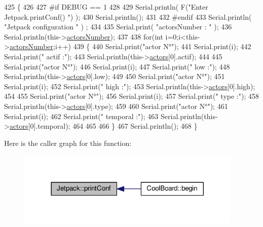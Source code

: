 \begin{DoxyCode}
425 \{
426 
427 \textcolor{preprocessor}{#if DEBUG == 1 }
428 
429     Serial.println( F(\textcolor{stringliteral}{"Enter Jetpack.printConf() "}) );
430     Serial.println();
431 
432 \textcolor{preprocessor}{#endif }
433     Serial.println( \textcolor{stringliteral}{"Jetpack configuration "} ) ;
434 
435     Serial.print( \textcolor{stringliteral}{"actorsNumber : "} );
436     Serial.println(this->\hyperlink{classJetpack_a52c86319cb3f7f1ab744a64db18a7ba5}{actorsNumber});
437  
438         \textcolor{keywordflow}{for}(\textcolor{keywordtype}{int} i=0;i<this->\hyperlink{classJetpack_a52c86319cb3f7f1ab744a64db18a7ba5}{actorsNumber};i++)
439     \{   
440         Serial.print(\textcolor{stringliteral}{"actor N°"});
441         Serial.print(i);
442         Serial.print(\textcolor{stringliteral}{" actif :"});
443         Serial.println(this->\hyperlink{classJetpack_a7e16d2f97837f9712a2e6de1c50d99db}{actors}[0].actif);
444 
445         Serial.print(\textcolor{stringliteral}{"actor N°"});
446         Serial.print(i);
447         Serial.print(\textcolor{stringliteral}{" low :"});
448         Serial.println(this->\hyperlink{classJetpack_a7e16d2f97837f9712a2e6de1c50d99db}{actors}[0].low);
449 
450         Serial.print(\textcolor{stringliteral}{"actor N°"});
451         Serial.print(i);
452         Serial.print(\textcolor{stringliteral}{" high :"});
453         Serial.println(this->\hyperlink{classJetpack_a7e16d2f97837f9712a2e6de1c50d99db}{actors}[0].high);
454 
455         Serial.print(\textcolor{stringliteral}{"actor N°"});
456         Serial.print(i);
457         Serial.print(\textcolor{stringliteral}{" type :"});
458         Serial.println(this->\hyperlink{classJetpack_a7e16d2f97837f9712a2e6de1c50d99db}{actors}[0].type);
459         
460         Serial.print(\textcolor{stringliteral}{"actor N°"});
461         Serial.print(i);
462         Serial.print(\textcolor{stringliteral}{" temporal :"});
463         Serial.println(this->\hyperlink{classJetpack_a7e16d2f97837f9712a2e6de1c50d99db}{actors}[0].temporal);
464  
465 
466     \}
467     Serial.println();
468 \}
\end{DoxyCode}
Here is the caller graph for this function\+:
\nopagebreak
\begin{figure}[H]
\begin{center}
\leavevmode
\includegraphics[width=305pt]{classJetpack_ac54a7bb4f9166bee32052253d9b1d306_icgraph}
\end{center}
\end{figure}
\mbox{\label{classJetpack_a338f1af8cbc6504ac69b47c7328569b5}} 
